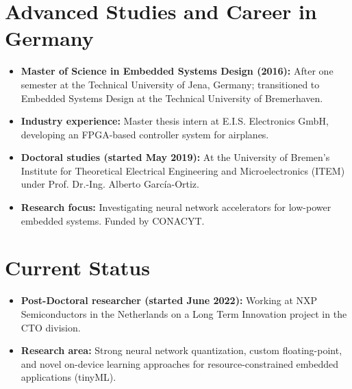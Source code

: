 \documentclass{article}
\begin{document}
\section*{Advanced Studies and Career in Germany}
\begin{itemize}[noitemsep]
    \item \textbf{Master of Science in Embedded Systems Design (2016):} After one semester at the Technical University of Jena, Germany; transitioned to Embedded Systems Design at the Technical University of Bremerhaven.
    \item \textbf{Industry experience:} Master thesis intern at E.I.S. Electronics GmbH, developing an FPGA-based controller system for airplanes.
    \item \textbf{Doctoral studies (started May 2019):} At the University of Bremen's Institute for Theoretical Electrical Engineering and Microelectronics (ITEM) under Prof. Dr.-Ing. Alberto García-Ortiz.
    \item \textbf{Research focus:} Investigating neural network accelerators for low-power embedded systems. Funded by CONACYT.
\end{itemize}

\section*{Current Status}
\begin{itemize}[noitemsep]
    \item \textbf{Post-Doctoral researcher (started June 2022):} Working at NXP Semiconductors in the Netherlands on a Long Term Innovation project in the CTO division.
    \item \textbf{Research area:} Strong neural network quantization, custom floating-point, and novel on-device learning approaches for resource-constrained embedded applications (tinyML).
\end{itemize}
\end{document}
